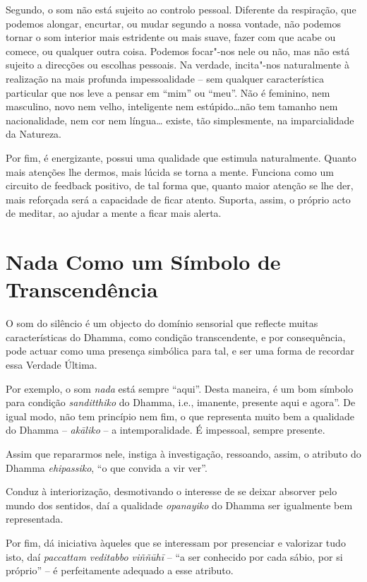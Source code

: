 Segundo, o som não está sujeito ao controlo pessoal. Diferente da
respiração, que podemos alongar, encurtar, ou mudar segundo a nossa
vontade, não podemos tornar o som interior mais estridente ou mais
suave, fazer com que acabe ou comece, ou qualquer outra coisa. Podemos
focar"-nos nele ou não, mas não está sujeito a direcções ou escolhas
pessoais. Na verdade, incita"-nos naturalmente à realização na mais
profunda impessoalidade -- sem qualquer característica particular que
nos leve a pensar em ``mim'' ou ``meu''. Não é feminino, nem masculino,
novo nem velho, inteligente nem estúpido\ldots{}não tem tamanho nem
nacionalidade, nem cor nem língua\ldots{} existe, tão simplesmente, na
imparcialidade da Natureza.

Por fim, é energizante, possui uma qualidade que estimula naturalmente.
Quanto mais atenções lhe dermos, mais lúcida se torna a mente. Funciona
como um circuito de feedback positivo, de tal forma que, quanto maior
atenção se lhe der, mais reforçada será a capacidade de ficar atento.
Suporta, assim, o próprio acto de meditar, ao ajudar a mente a ficar
mais alerta.

\section{Nada Como um Símbolo de Transcendência}

O som do silêncio é um objecto do domínio sensorial que reflecte muitas
características do Dhamma, como condição transcendente, e por
consequência, pode actuar como uma presença simbólica para tal, e ser
uma forma de recordar essa Verdade Última.

Por exemplo, o som \emph{nada} está sempre ``aqui''. Desta maneira, é um
bom símbolo para condição \emph{sanditthiko} do Dhamma, i.e., imanente,
presente aqui e agora''. De igual modo, não tem princípio nem fim, o que
representa muito bem a qualidade do Dhamma -- \emph{akāliko} -- a
intemporalidade. É impessoal, sempre presente.

Assim que repararmos nele, instiga à investigação, ressoando, assim, o
atributo do Dhamma \emph{ehipassiko}, ``o que convida a vir ver''.

Conduz à interiorização, desmotivando o interesse de se deixar absorver
pelo mundo dos sentidos, daí a qualidade \emph{opanayiko} do Dhamma ser
igualmente bem representada.

Por fim, dá iniciativa àqueles que se interessam por presenciar e
valorizar tudo isto, daí \emph{paccattam veditabbo viññūhī} -- ``a ser
conhecido por cada sábio, por si próprio'' -- é perfeitamente adequado a
esse atributo.

